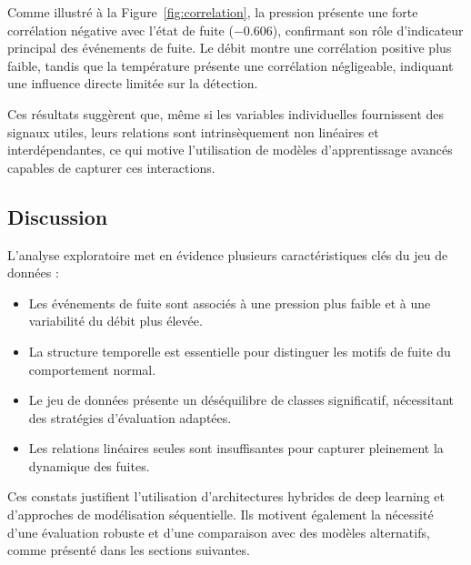 Comme illustré à la Figure~\ref{fig:correlation}, la pression présente une
forte corrélation négative avec l'état de fuite ($-0.606$), confirmant son rôle
d'indicateur principal des événements de fuite. Le débit montre une corrélation
positive plus faible, tandis que la température présente une corrélation
négligeable, indiquant une influence directe limitée sur la détection.

Ces résultats suggèrent que, même si les variables individuelles fournissent des
signaux utiles, leurs relations sont intrinsèquement non linéaires et
interdépendantes, ce qui motive l'utilisation de modèles d'apprentissage avancés
capables de capturer ces interactions.

\subsection{Discussion}

L'analyse exploratoire met en évidence plusieurs caractéristiques clés du jeu
de données :

\begin{itemize}
    \item Les événements de fuite sont associés à une pression plus faible et à une variabilité du débit plus élevée.
    \item La structure temporelle est essentielle pour distinguer les motifs de fuite du comportement normal.
    \item Le jeu de données présente un déséquilibre de classes significatif, nécessitant des stratégies d'évaluation adaptées.
    \item Les relations linéaires seules sont insuffisantes pour capturer pleinement la dynamique des fuites.
\end{itemize}

Ces constats justifient l'utilisation d'architectures hybrides de deep learning
et d'approches de modélisation séquentielle. Ils motivent également la nécessité
d'une évaluation robuste et d'une comparaison avec des modèles alternatifs,
comme présenté dans les sections suivantes.